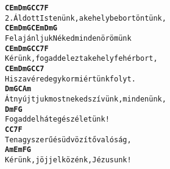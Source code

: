 \cleardoublepage
{}
\kottastart
{}
\kottaend
\begin{minipage}{\textwidth}
\begin{alltt}
\textbf{   C  Em   Dm  G         C      C7     F}
2. Áldott Istenünk, a kehelybe bort öntünk,
\textbf{        C   Em  Dm    G         C  Em Dm G}
   Felajánljuk Néked minden örömünk
\textbf{    C Em    Dm    G         C      C7    F}
   Kérünk, fogadd el ezt a kehely fehér bort,
\textbf{           C Em Dm      G        C C7}
   Hisz a véred egykor miértünk folyt.
\textbf{   Dm               G      C            Am}
   Átnyújtjuk most neked szívünk, mindenünk,
\textbf{    Dm             F       G}
   Fogadd el hát egész életünk!
\textbf{       C           C7        F}
   Te nagyszerű és üdvözítő valóság,
\textbf{    Am      Em      F           G}
   Kérünk, jöjj el közénk, Jézusunk!
\end{alltt}
\vspace{0.0cm}
\versszakspacing
\end{minipage}
~\vspace{1.0cm}
\newline
